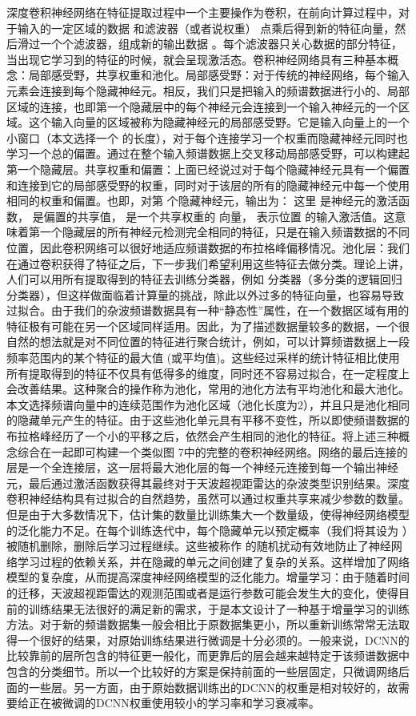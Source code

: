 深度卷积神经网络在特征提取过程中一个主要操作为卷积，在前向计算过程中，对于输入的一定区域的数据 和滤波器（或者说权重） 点乘后得到新的特征向量，然后滑过一个个滤波器，组成新的输出数据 。每个滤波器只关心数据的部分特征，当出现它学习到的特征的时候，就会呈现激活态。卷积神经网络具有三种基本概念：局部感受野，共享权重和池化。局部感受野：对于传统的神经网络，每个输入元素会连接到每个隐藏神经元。相反，我们只是把输入的频谱数据进行小的、局部区域的连接，也即第一个隐藏层中的每个神经元会连接到一个输入神经元的一个区域。这个输入向量的区域被称为隐藏神经元的局部感受野。它是输入向量上的一个小窗口（本文选择一个 的长度），对于每个连接学习一个权重而隐藏神经元同时也学习一个总的偏置。通过在整个输入频谱数据上交叉移动局部感受野，可以构建起第一个隐藏层。共享权重和偏置：上面已经说过对于每个隐藏神经元具有一个偏置和连接到它的局部感受野的权重，同时对于该层的所有的隐藏神经元中每一个使用相同的权重和偏置。也即，对第 个隐藏神经元，输出为： 这里 是神经元的激活函数， 是偏置的共享值， 是一个共享权重的 向量， 表示位置 的输入激活值。这意味着第一个隐藏层的所有神经元检测完全相同的特征，只是在输入频谱数据的不同位置，因此卷积网络可以很好地适应频谱数据的布拉格峰偏移情况。池化层：我们在通过卷积获得了特征之后，下一步我们希望利用这些特征去做分类。理论上讲，人们可以用所有提取得到的特征去训练分类器，例如 分类器（多分类的逻辑回归分类器），但这样做面临着计算量的挑战，除此以外过多的特征向量，也容易导致过拟合。由于我们的杂波频谱数据具有一种“静态性”属性，在一个数据区域有用的特征极有可能在另一个区域同样适用。因此，为了描述数据量较多的数据，一个很自然的想法就是对不同位置的特征进行聚合统计，例如，可以计算频谱数据上一段频率范围内的某个特征的最大值 (或平均值)。这些经过采样的统计特征相比使用所有提取得到的特征不仅具有低得多的维度，同时还不容易过拟合，在一定程度上会改善结果。这种聚合的操作称为池化，常用的池化方法有平均池化和最大池化。 本文选择频谱向量中的连续范围作为池化区域（池化长度为2），并且只是池化相同的隐藏单元产生的特征。由于这些池化单元具有平移不变性，所以即使频谱数据的布拉格峰经历了一个小的平移之后，依然会产生相同的池化的特征。将上述三种概念综合在一起即可构建一个类似图 7中的完整的卷积神经网络。网络的最后连接的层是一个全连接层，这一层将最大池化层的每一个神经元连接到每一个输出神经元，最后通过激活函数获得其最终对于天波超视距雷达的杂波类型识别结果。深度卷积神经结构具有过拟合的自然趋势，虽然可以通过权重共享来减少参数的数量。但是由于大多数情况下，估计集的数量比训练集大一个数量级，使得神经网络模型的泛化能力不足。在每个训练迭代中，每个隐藏单元以预定概率（我们将其设为 ）被随机删除，删除后学习过程继续。这些被称作 的随机扰动有效地防止了神经网络学习过程的依赖关系，并在隐藏的单元之间创建了复杂的关系。这样增加了网络模型的复杂度，从而提高深度神经网络模型的泛化能力。增量学习：由于随着时间的迁移，天波超视距雷达的观测范围或者是运行参数可能会发生大的变化，使得目前的训练结果无法很好的满足新的需求，于是本文设计了一种基于增量学习的训练方法。对于新的频谱数据集一般会相比于原数据集更小，所以重新训练常常无法取得一个很好的结果，对原始训练结果进行微调是十分必须的。一般来说，DCNN的比较靠前的层所包含的特征更一般化，而更靠后的层会越来越特定于该频谱数据中包含的分类细节。所以一个比较好的方案是保持前面的一些层固定，只微调网络后面的一些层。另一方面，由于原始数据训练出的DCNN的权重是相对较好的，故需要给正在被微调的DCNN权重使用较小的学习率和学习衰减率。


